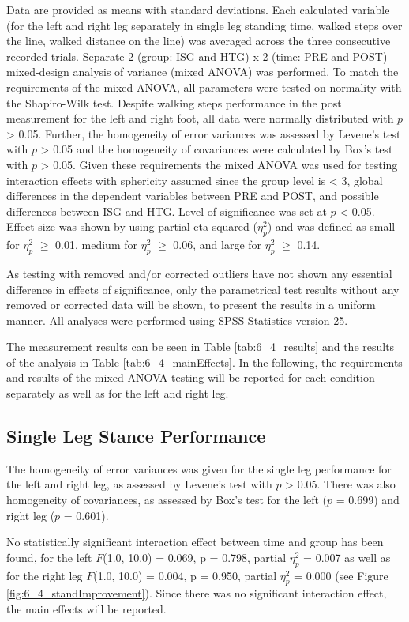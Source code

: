 Data are provided as means with standard deviations.
Each calculated variable (for the left and right leg separately in single leg standing time, walked steps over the line, walked distance on the line) was averaged across the three consecutive recorded trials.
Separate 2 (group: ISG and HTG) x 2 (time: PRE and POST) mixed-design analysis of variance (mixed ANOVA) was performed.
To match the requirements of the mixed ANOVA, all parameters were tested on normality with the Shapiro-Wilk test.
Despite walking steps performance in the post measurement for the left and right foot, all data were normally distributed with $p$ > 0.05.
Further, the homogeneity of error variances was assessed by Levene's test with $p$ > 0.05 and the homogeneity of covariances were calculated by Box's test with $p$ > 0.05.
Given these requirements the mixed ANOVA was used for testing interaction effects with sphericity assumed since the group level is < 3, global differences in the dependent variables between PRE and POST, and possible differences between ISG and HTG.
Level of significance was set at $p$ < 0.05.
Effect size was shown by using partial eta squared ($\eta_{p}^{2}$) and was defined as small for $\eta_{p}^{2}$ $\geq$ 0.01, medium for $\eta_{p}^{2}$ $\geq$ 0.06, and large for $\eta_{p}^{2}$ $\geq$ 0.14.

As testing with removed and/or corrected outliers have not shown any essential difference in effects of significance, only the parametrical test results without any removed or corrected data will be shown, to present the results in a uniform manner.
All analyses were performed using SPSS Statistics version 25.

The measurement results can be seen in Table \ref{tab:6_4_results} and the results of the analysis in Table \ref{tab:6_4_mainEffects}.
In the following, the requirements and results of the mixed ANOVA testing will be reported for each condition separately as well as for the left and right leg.

\subsection{Single Leg Stance Performance}
The homogeneity of error variances was given for the single leg performance for the left and right leg, as assessed by Levene's test with $p$ > 0.05.
There was also homogeneity of covariances, as assessed by Box's test for the left ($p$ = 0.699) and right leg ($p$ = 0.601).

No statistically significant interaction effect between time and group has been found, for the left $F$(1.0, 10.0) = 0.069, p = 0.798, partial $\eta_{p}^{2}$ = 0.007 as well as for the right leg $F$(1.0, 10.0) = 0.004, p = 0.950, partial $\eta_{p}^{2}$ = 0.000 (see Figure \ref{fig:6_4_standImprovement}).
Since there was no significant interaction effect, the main effects will be reported.

